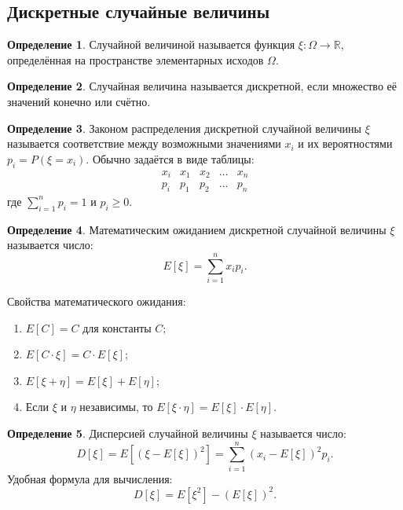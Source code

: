 \documentclass[a4paper]{article}
\theoremstyle{definition}
\newtheorem{definition}{Определение}[subsection]
\begin{document}
\subsection{Дискретные случайные величины}

\begin{definition}
Случайной величиной называется функция $\xi : \Omega \to \mathbb{R}$, определённая на пространстве элементарных исходов $\Omega$.
\end{definition}

\begin{definition}
Случайная величина называется дискретной, если множество её значений конечно или счётно.
\end{definition}

\begin{definition}
Законом распределения дискретной случайной величины $\xi$ называется соответствие между возможными значениями $x_i$ и их вероятностями $p_i = P(\xi = x_i)$. Обычно задаётся в виде таблицы:
\[
\begin{array}{c|cccc}
x_i & x_1 & x_2 & \dots & x_n \\
\hline
p_i & p_1 & p_2 & \dots & p_n
\end{array}
\]
где $\sum_{i=1}^{n} p_i = 1$ и $p_i \ge 0$.
\end{definition}

\begin{definition}
Математическим ожиданием дискретной случайной величины $\xi$ называется число:
\begin{equation}
    E[\xi] = \sum_{i=1}^{n} x_i p_i. \tag{13}
\end{equation}
\end{definition}

Свойства математического ожидания:
\begin{enumerate}
    \item $E[C] = C$ для константы $C$;
    \item $E[C \cdot \xi] = C \cdot E[\xi]$;
    \item $E[\xi + \eta] = E[\xi] + E[\eta]$;
    \item Если $\xi$ и $\eta$ независимы, то $E[\xi \cdot \eta] = E[\xi] \cdot E[\eta]$.
\end{enumerate}

\begin{definition}
Дисперсией случайной величины $\xi$ называется число:
\begin{equation}
    D[\xi] = E[(\xi - E[\xi])^2] = \sum_{i=1}^{n} (x_i - E[\xi])^2 p_i. \tag{14}
\end{equation}
Удобная формула для вычисления:
\begin{equation}
    D[\xi] = E[\xi^2] - (E[\xi])^2. \tag{15}
\end{equation}
\end{definition}
\end{document}
